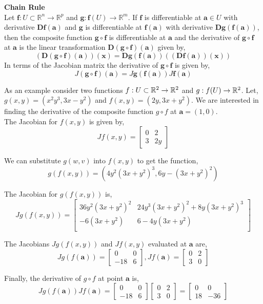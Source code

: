 \documentclass[12pt]{article}
\begin{document}
\begin{framed}
\textbf{Chain Rule} \\
Let $\mathbf{f}:U\subset\mathbb{R}^n\rightarrow\mathbb{R}^p$ and $\mathbf{g}:\mathbf{f}(U)\rightarrow\mathbb{R}^m$. If $\mathbf{f}$ is differentiable at $\mathbf{a}\in U$ with derivative $\mathbf{Df(a)}$ and $\mathbf{g}$ is differentiable at $\mathbf{f(a)}$ with derivative $\mathbf{Dg(f(a))}$, then the composite function $\mathbf{g}\circ\mathbf{f}$ is differentiable at $\mathbf{a}$ and the derivative of $\mathbf{g}\circ\mathbf{f}$ at $\mathbf{a}$ is the linear transformation $\mathbf{D(g\circ f)(a)}$ given by,
\[
\mathbf{(D(g\circ f)(a))(x) = Dg(f(a))((Df(a))(x)) }
\]
In terms of the Jacobian matrix the derivative of $\mathbf{g\circ f}$ is given by,
\[
J(\mathbf{g\circ f})(\mathbf{a}) = J\mathbf{g(f(a))}J\mathbf{f(a)}
\] 
\end{framed}

 As an example consider two functions $f:U\subset\mathbb{R}^2\rightarrow\mathbb{R}^2$ and $g:f(U)\rightarrow\mathbb{R}^2$. Let, $g(x,y) = (x^2y^3, 3x-y^2)$ and $f(x,y) = (2y, 3x+y^2)$. We are interested in finding the derivative of the composite function $g\circ f$ at $\mathbf{a}=(1,0)$.\\

 The Jacobian for $f(x,y)$ is given by,
\[
Jf(x,y) = 
\begin{bmatrix}
0 & 2 \\
3  & 2y
\end{bmatrix}
\]

 We can substitute $g(w,v)$ into $f(x,y)$ to get the function,
\[
g(f(x,y)) = (4y^2(3x+y^2)^3, 6y-(3x+y^2)^2)
\] 

 The Jacobian for $g(f(x,y))$ is,
\[
Jg(f(x,y)) = 
\begin{bmatrix}
36y^2(3x+y^2)^2 & 24y^3(3x+y^2)^2 + 8y(3x+y^2)^3 \\
-6(3x+y^2) & 6 - 4y(3x+y^2) \\
\end{bmatrix}
\]

 The Jacobians $Jg(f(x,y))$ and $Jf(x,y)$ evaluated at $\mathbf{a}$ are,
\[
Jg(f(\mathbf{a})) = 
\begin{bmatrix}
0 & 0 \\
-18 & 6
\end{bmatrix}
,
Jf(\mathbf{a}) = 
\begin{bmatrix}
0 & 2 \\
3 & 0
\end{bmatrix}
\]

 Finally, the derivative of $g\circ f$ at point $\mathbf{a}$ is,
\[
Jg(f(\mathbf{a}))Jf(\mathbf{a}) = 
\begin{bmatrix}
0 & 0 \\
-18 & 6
\end{bmatrix}
\begin{bmatrix}
0 & 2 \\
3 & 0
\end{bmatrix}
=
\begin{bmatrix}
0 & 0 \\
18 & -36
\end{bmatrix}
\]
\end{document}
